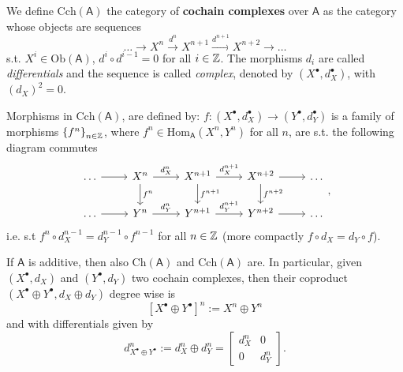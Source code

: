 \begin{defn}
	We define $\mathrm{Cch}(\mathsf{A})$ the category of \textbf{cochain complexes} over $\mathsf{A}$
	as the category whose objects are sequences
	\begin{equation}
	\ldots \to X^n \xrightarrow{d^n} X^{n+1}
	\xrightarrow{d^{n+1}} X^{n+2} \to \ldots
	\end{equation} 
	s.t. $X^i \in \mathrm{Ob} \left(\mathsf{A}\right)$, $d^i \circ d^{i-1} = 0$ for all $i \in \mathbb{Z}$.
	The morphisms $d_i$ are called \textit{differentials} and the sequence is called \textit{complex},
	denoted by $\left( X^{\bullet}, d_X^{\bullet} \right)$, with $\left( d_X \right)^2 = 0$.

	Morphisms in $\mathrm{Cch}(\mathsf{A})$, are defined by:
	$f:\left(X^{\bullet}, d_X^{\bullet}\right) \to \left(Y^{\bullet}, d_Y^{\bullet}\right)$
	is a family of morphisms $\left\{ f^n \right\}_{n \in \mathbb{Z}}$, where
	$f^n \in \mathrm{Hom}_{\mathsf{A}} \left( X^n, Y^n \right)$ for all $n$,
	are s.t. the following diagram commutes
	\begin{equation}
	\begin{tikzcd}
		\ldots \arrow[r, "", rightarrow] &
		X^n \arrow[r, "d_X^n", rightarrow] \arrow[d, "f^n", rightarrow] &
		X^{n+1} \arrow[r, "d_X^{n+1}", rightarrow] \arrow[d, "f^{n+1}", rightarrow] &
		X^{n+2} \arrow[r, "", rightarrow] \arrow[d, "f^{n+2}", rightarrow] &
		\ldots \\
		\ldots \arrow[r, "", rightarrow] &
		Y^n \arrow[r, "d_Y^n", rightarrow]&
		Y^{n+1} \arrow[r, "d_Y^{n+1}", rightarrow] &
		Y^{n+2} \arrow[r, "", rightarrow] &
		\ldots
	\end{tikzcd}
	,\end{equation} 
	i.e. s.t $f^n \circ d_X^{n-1} = d_Y^{n-1} \circ f^{n-1}$ for all $n \in \mathbb{Z}$
	(more compactly $f \circ d_X = d_Y \circ f$).
\end{defn}

\begin{rem}
	If $\mathsf{A}$ is additive, then also $\mathrm{Ch}(\mathsf{A})$ and $\mathrm{Cch}(\mathsf{A})$ are.
	In particular, given $\left(X^{\bullet}, d_X\right)$ and $\left(Y^{\bullet}, d_Y \right)$ two cochain complexes,
	then their coproduct $\left(X^{\bullet} \oplus Y^{\bullet}, d_X \oplus d_Y\right)$ degree wise is
	\begin{equation}
	\left[ X^{\bullet} \oplus Y^{\bullet} \right]^n := X^n \oplus Y^n
	\end{equation} 
	and with differentials given by
	\begin{equation}
	d^n_{X^{\bullet} \oplus Y^{\bullet}} :=
	d^n_X \oplus d^n_Y =
	\begin{bmatrix}
		d^n_X & 0\\
		0 & d^n_Y
	\end{bmatrix} 
	.\end{equation} 
\end{rem}

